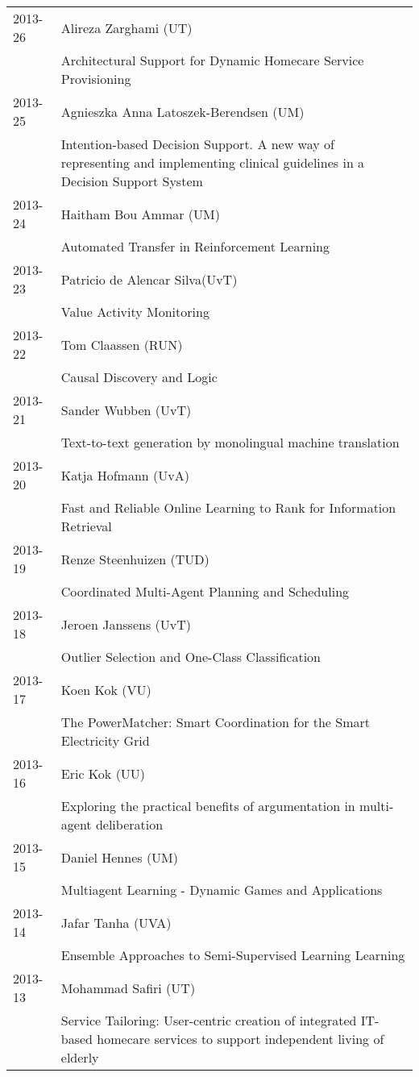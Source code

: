 \begin{longtable}{p{1.25cm}p{10.75cm}}
\\
2013-26 & Alireza Zarghami (UT) \\& Architectural Support for Dynamic Homecare Service Provisioning \\
2013-25 & Agnieszka Anna Latoszek-Berendsen (UM) \\& Intention-based Decision Support. A new way of representing and \newline implementing clinical guidelines in a Decision Support System \\
2013-24 & Haitham Bou Ammar (UM) \\& Automated Transfer in Reinforcement Learning \\
2013-23 & Patricio de Alencar Silva(UvT) \\& Value Activity Monitoring \\
2013-22 & Tom Claassen (RUN) \\& Causal Discovery and Logic \\
2013-21 & Sander Wubben (UvT) \\& Text-to-text generation by monolingual machine translation \\
2013-20 & Katja Hofmann (UvA) \\& Fast and Reliable Online Learning to Rank for Information Retrieval \\
2013-19 & Renze Steenhuizen (TUD) \\& Coordinated Multi-Agent Planning and Scheduling \\
2013-18 & Jeroen Janssens (UvT) \\& Outlier Selection and One-Class Classification \\
2013-17 & Koen Kok (VU) \\& The PowerMatcher: Smart Coordination for the Smart Electricity Grid \\
2013-16 & Eric Kok (UU) \\& Exploring the practical benefits of argumentation in multi-agent \newline deliberation \\
2013-15 & Daniel Hennes (UM) \\& Multiagent Learning - Dynamic Games and Applications \\
2013-14 & Jafar Tanha (UVA) \\& Ensemble Approaches to Semi-Supervised Learning Learning \\
2013-13 & Mohammad Safiri (UT) \\& Service Tailoring: User-centric creation of integrated IT-based homecare services to support independent living of elderly \\

\end{longtable}
